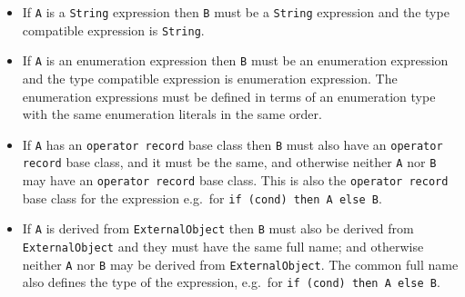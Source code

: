\begin{itemize}
\item
  If \lstinline!A! is a \lstinline!String! expression then \lstinline!B! must be a \lstinline!String! expression and the type compatible expression is \lstinline!String!.
\item
  If \lstinline!A! is an enumeration expression then \lstinline!B! must be an enumeration expression and the type compatible expression is enumeration expression.
  The enumeration expressions must be defined in terms of an enumeration type with the same enumeration literals in the same order.
\item
  If \lstinline!A! has an \lstinline!operator record! base class then \lstinline!B! must also have an \lstinline!operator record! base class, and it must be the same, and otherwise neither \lstinline!A! nor \lstinline!B! may have an \lstinline!operator record! base class.
  This is also the \lstinline!operator record! base class for the expression e.g.\ for \lstinline!if (cond) then A else B!.
\item
  If \lstinline!A! is derived from \lstinline!ExternalObject! then \lstinline!B! must also be derived from \lstinline!ExternalObject! and they must have the same full name; and otherwise neither \lstinline!A! nor \lstinline!B! may be derived from \lstinline!ExternalObject!.
  The common full name also defines the type of the expression, e.g.\ for \lstinline!if (cond) then A else B!.
\end{itemize}
